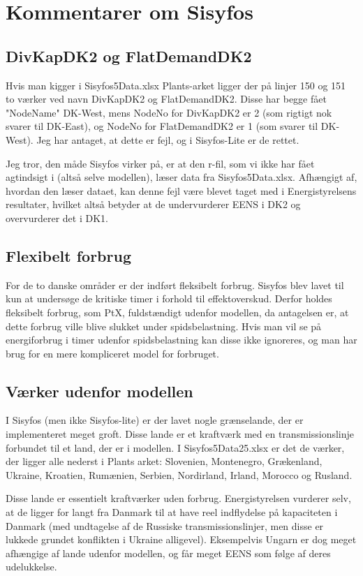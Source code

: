 \documentclass{article}
\begin{document}
\section{Kommentarer om Sisyfos}
\subsection{DivKapDK2 og FlatDemandDK2}
Hvis man kigger i Sisyfos5Data.xlsx Plants-arket ligger der på linjer 150 og 151 to værker ved navn DivKapDK2 og FlatDemandDK2. Disse har begge fået "NodeName" DK-West, mens NodeNo for DivKapDK2 er 2 (som rigtigt nok svarer til DK-East), og NodeNo for FlatDemandDK2 er 1 (som svarer til DK-West). Jeg har antaget, at dette er fejl, og i Sisyfos-Lite er de rettet. 

Jeg tror, den måde Sisyfos virker på, er at den r-fil, som vi ikke har fået agtindsigt i (altså selve modellen), læser data fra Sisyfos5Data.xlsx. Afhængigt af, hvordan den læser dataet, kan denne fejl være blevet taget med i Energistyrelsens resultater, hvilket altså betyder at de undervurderer EENS i DK2 og overvurderer det i DK1. 
\subsection{Flexibelt forbrug}
For de to danske områder er der indført fleksibelt forbrug. Sisyfos blev lavet til kun at undersøge de kritiske timer i forhold til effektoverskud. Derfor holdes fleksibelt forbrug, som PtX, fuldstændigt udenfor modellen, da antagelsen er, at dette forbrug ville blive slukket under spidsbelastning. Hvis man vil se på energiforbrug i timer udenfor spidsbelastning kan disse ikke ignoreres, og man har brug for en mere kompliceret model for forbruget.
\subsection{Værker udenfor modellen}
I Sisyfos (men ikke Sisyfos-lite) er der lavet nogle grænselande, der er implementeret meget groft. Disse lande er et kraftværk med en transmissionslinje forbundet til et land, der er i modellen. I Sisyfos5Data25.xlsx er det de værker, der ligger alle nederst i Plants arket: Slovenien, Montenegro, Grækenland, Ukraine, Kroatien, Rumænien, Serbien, Nordirland, Irland, Morocco og Rusland. 

Disse lande er essentielt kraftværker uden forbrug. Energistyrelsen vurderer selv, at de ligger for langt fra Danmark til at have reel indflydelse på kapaciteten i Danmark (med undtagelse af de Russiske transmissionslinjer, men disse er lukkede grundet konflikten i Ukraine alligevel). Eksempelvis Ungarn er dog meget afhængige af lande udenfor modellen, og får meget EENS som følge af deres udelukkelse.
\end{document}
